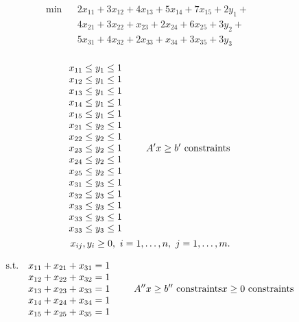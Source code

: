 \documentclass[11pt]{article}
\begin{document}
\vskip 10pt
\begin{eqnarray*}
\min  && 2x_{11} +3 x_{12} + 4x_{13} + 5x_{14}+ 7x_{15} + 2 y_{1} + \\
&& 4x_{21} +3 x_{22} + x_{23} + 2x_{24}+  6x_{25} + 3y_{2}+ \\
&& 5x_{31} +4 x_{32} + 2 x_{33} + x_{34}+  3x_{35} +   3y_{3} \\
\end{eqnarray*}


\begin{eqnarray*}
\begin{array}{lll}
x_{11}\leq y_{1}\leq 1 & &  \\
x_{12}\leq y_{1}\leq 1 & & \\
x_{13}\leq y_{1}\leq 1 & & \\
x_{14}\leq y_{1}\leq 1 & & \\
x_{15}\leq y_{1}\leq 1 & & \\
x_{21}\leq y_{2}\leq 1 & & \\
x_{22}\leq y_{2}\leq 1 & &   \\
x_{23}\leq y_{2}\leq 1 & & \\
x_{24}\leq y_{2}\leq 1 & & \\
x_{25}\leq y_{2}\leq 1 & & \\
x_{31}\leq y_{3}\leq 1 & & \\
x_{32}\leq y_{3}\leq 1 & &\\
x_{33}\leq y_{3}\leq 1 & &\\ 
x_{33}\leq y_{3}\leq 1 & &\\ 
x_{33}\leq y_{3}\leq 1 & &\\ 
\end{array}
 A^{\prime}x \ge b^{\prime} \,\, {\rm constraints} \\
x_{ij},y_{i}\ge 0 , \,\, i = 1, \ldots, n, \, \, j = 1, \ldots, m.   
\end{eqnarray*}


\[
\begin{array}{llll}
{\rm s.t.} &x_{11}+x_{21}+x_{31}  = 1 & & \\
&x_{12}+x_{22}+x_{32} = 1 & &   \\
&x_{13}+x_{23}+x_{33} = 1 & &  \\
&x_{14}+x_{24}+x_{34} = 1 & &  \\
&x_{15}+x_{25}+x_{35} = 1 & &  
\end{array}   A^{\prime \prime}   x \ge b^{\prime \prime} \,\, {\rm
constraints}x \ge 0 \,\, {\rm constraints}
\]
  
  
\end{document}
